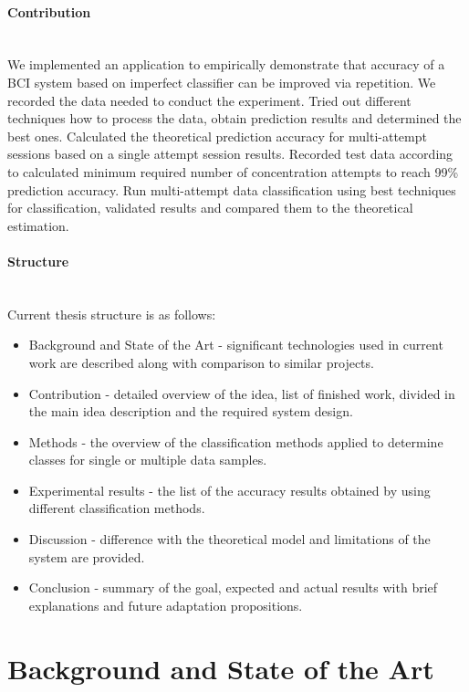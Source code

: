 \documentclass[12pt]{article}
\theoremstyle{definition}
\begin{document}
\paragraph{Contribution}~\\

We implemented an application to empirically demonstrate that accuracy of a BCI system based on imperfect classifier can be improved via repetition. We recorded the data needed to conduct the experiment. Tried out different techniques how to process the data, obtain prediction results and determined the best ones. Calculated the theoretical prediction accuracy for multi-attempt sessions based on a single attempt session results. Recorded test data according to calculated minimum required number of concentration attempts to reach 99\% prediction accuracy. Run multi-attempt data classification using best techniques for classification, validated results and compared them to the theoretical estimation.
\paragraph{Structure}~\\
Current thesis structure is as follows:

\begin{itemize}
\item Background and State of the Art - significant technologies used in current work are described along with comparison to similar projects.
\item Contribution - detailed overview of the idea, list of finished work, divided in the  main idea description and the required system design.
\item Methods - the overview of the classification methods applied to determine classes for single or multiple data samples.
\item Experimental results - the list of the accuracy results obtained by using different classification methods.
\item Discussion - difference with the theoretical model and limitations of the system are provided.
\item Conclusion - summary of the goal, expected and actual results with brief explanations and future adaptation propositions.
\end{itemize}

\newpage
\section{Background and State of the Art} 
\end{document}
